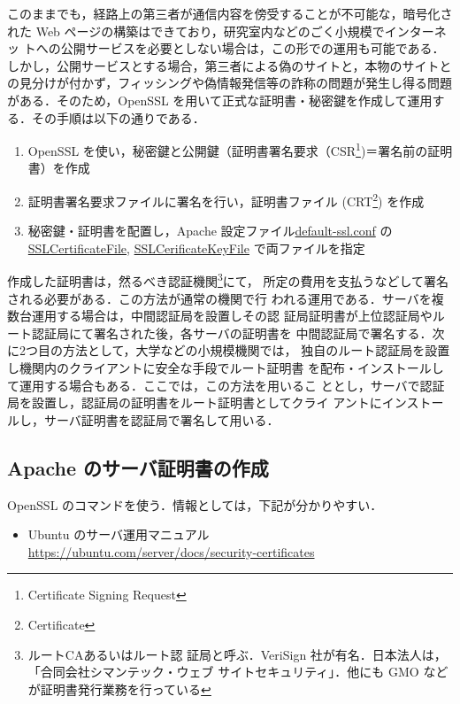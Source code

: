 このままでも，経路上の第三者が通信内容を傍受することが不可能な，暗号化さ
れた Web ページの構築はできており，研究室内などのごく小規模でインターネッ
トへの公開サービスを必要としない場合は，この形での運用も可能である．
しかし，公開サービスとする場合，第三者による偽のサイトと，本物のサイトと
の見分けが付かず，フィッシングや偽情報発信等の詐称の問題が発生し得る問題
がある．そのため，OpenSSL を用いて正式な証明書・秘密鍵を作成して運用する．その手順は以下の通りである．

\begin{enumerate}
 \item OpenSSL を使い，秘密鍵と公開鍵（証明書署名要求（CSR\footnote{Certificate Signing Request})＝署名前の証明書）を作成
 \item 証明書署名要求ファイルに署名を行い，証明書ファイル (CRT\footnote{Certificate}) を作成
 \item 秘密鍵・証明書を配置し，Apache 設定ファイル\url{default-ssl.conf} の\url{SSLCertificateFile}, \url{SSLCerificateKeyFile} で両ファイルを指定
\end{enumerate}

作成した証明書は，然るべき認証機関\footnote{ルートCAあるいはルート認
証局と呼ぶ．VeriSign 社が有名．日本法人は，「合同会社シマンテック・ウェブ
サイトセキュリティ」．他にも GMO などが証明書発行業務を行っている}にて，
所定の費用を支払うなどして署名される必要がある．この方法が通常の機関で行
われる運用である．サーバを複数台運用する場合は，中間認証局を設置しその認
証局証明書が上位認証局やルート認証局にて署名された後，各サーバの証明書を
中間認証局で署名する．次に2つ目の方法として，大学などの小規模機関では，
独自のルート認証局を設置し機関内のクライアントに安全な手段でルート証明書
を配布・インストールして運用する場合もある．ここでは，この方法を用いるこ
ととし，サーバで認証局を設置し，認証局の証明書をルート証明書としてクライ
アントにインストールし，サーバ証明書を認証局で署名して用いる．

\subsection{Apache のサーバ証明書の作成}

OpenSSL のコマンドを使う．情報としては，下記が分かりやすい．
\begin{itemize}
 \item Ubuntu のサーバ運用マニュアル\\
 \url{https://ubuntu.com/server/docs/security-certificates}
\end{itemize}

